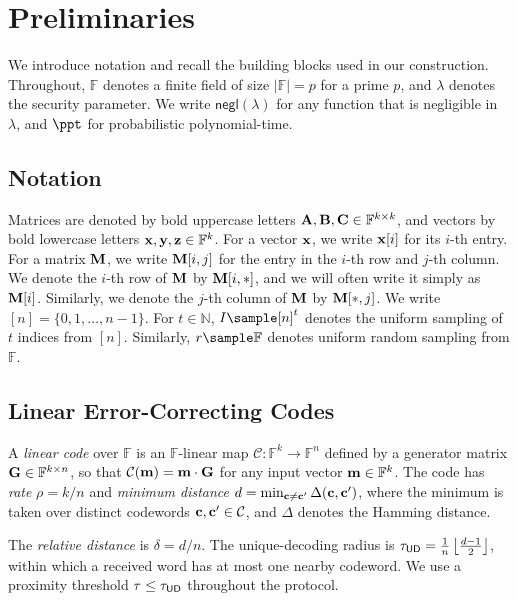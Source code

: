 \section{Preliminaries}
\label{sec:prelim}

We introduce notation and recall the building blocks used in our construction.
Throughout, $\mathbb{F}$ denotes a finite field of size $|\mathbb{F}| = p$ for a prime $p$, and $\lambda$ denotes the security parameter.
We write $\textsf{negl}(\lambda)$ for any function that is negligible in~$\lambda$, and $\ppt$ for probabilistic polynomial-time.

\subsection{Notation}
\label{sec:notation}

Matrices are denoted by bold uppercase letters $\mathbf{A}, \mathbf{B}, \mathbf{C} \in \mathbb{F}^{k \times k}$, and vectors by bold lowercase letters $\mathbf{x}, \mathbf{y}, \mathbf{z} \in \mathbb{F}^k$.
For a vector $\mathbf{x}$, we write $\mathbf{x}[i]$ for its $i$-th entry. For a
matrix $\mathbf{M}$, we write $\mathbf{M}[i,j]$ for the entry in the $i$-th row and $j$-th column. 
We denote the $i$-th row of $\mathbf{M}$ by $\mathbf{M}[i,*]$, and we will often write it simply as $\mathbf{M}[i]$. 
Similarly, we denote the $j$-th column of $\mathbf{M}$ by $\mathbf{M}[*,j]$. We write $[n] = \{0,1,\ldots,n-1\}$. For $t \in \mathbb{N}$, $I \sample [n]^t$ denotes the uniform sampling of $t$ indices from $[n]$. Similarly, $r \sample \mathbb{F}$ denotes uniform random sampling from
$\mathbb{F}$.



\subsection{Linear Error-Correcting Codes}
\label{sec:prelim-codes}

A \emph{linear code} over $\mathbb{F}$ is an $\mathbb{F}$-linear map
$\mathcal{C}: \mathbb{F}^k \to \mathbb{F}^n$ defined by a generator matrix
$\mathbf{G} \in \mathbb{F}^{k \times n}$, so that
$\mathcal{C}(\mathbf{m}) = \mathbf{m} \cdot \mathbf{G}$ for any input vector
$\mathbf{m} \in \mathbb{F}^k$.
The code has \emph{rate} $\rho = k/n$ and \emph{minimum distance} $d = \min_{\mathbf{c} \neq \mathbf{c}'} \Delta(\mathbf{c}, \mathbf{c}')$,
where the minimum is taken over distinct codewords
$\mathbf{c}, \mathbf{c}' \in \mathcal{C}$, and $\Delta$ denotes the Hamming distance.
\begin{revblock}
  The \emph{relative distance} is $\delta = d/n$. The unique-decoding radius is \(\tau_{\mathsf{UD}}=\frac{1}{n}\left\lfloor\frac{d-1}{2}\right\rfloor\), within which a received word has at most one nearby codeword. We use a proximity threshold \(\tau \leq \tau_{\mathsf{UD}}\) throughout the protocol.
\end{revblock}


